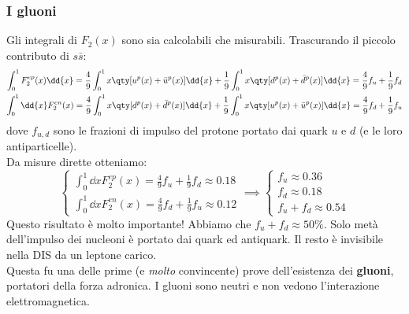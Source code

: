 \subsubsection{I gluoni}
Gli integrali di $F_2(x)$ sono sia calcolabili che misurabili. Trascurando il piccolo contributo di $s\bar s$:
\begin{gather*}
    \int_{0}^{1}F_2^{ep}(x)\dd{x}=\frac{4}{9}\int_{0}^{1}x\qty[u^p(x)+\bar u^p(x)]\dd{x}+\frac{1}{9}\int_{0}^{1}x\qty[d^p(x)+\bar d^p(x)]\dd{x}=\frac{4}{9}f_u+\frac{1}{9}f_d\\
    \int_{0}^{1}\dd{x}F_2^{en}(x)=\frac{4}{9}\int_{0}^{1}x\qty[d^p(x)+\bar d^p(x)]\dd{x}+\frac{1}{9}\int_{0}^{1}x\qty[u^p(x)+\bar u^p(x)]\dd{x}=\frac{4}{9}f_d+\frac{1}{9}f_u
\end{gather*}
dove $f_{u,d}$ sono le frazioni di impulso del protone portato dai quark $u$ e $d$ (e le loro antiparticelle).\\
Da misure dirette otteniamo:
\begin{equation*}
    \begin{cases}
        \int_{0}^{1}\dd{x}F_2^{ep}(x)=\frac{4}{9}f_u+\frac{1}{9}f_d\approx0.18\\
        \int_{0}^{1}\dd{x}F_2^{en}(x)=\frac{4}{9}f_d+\frac{1}{9}f_u\approx0.12
    \end{cases}\implies
    \begin{cases}
        f_u\approx0.36\\
        f_d\approx0.18\\
        f_u+f_d\approx0.54
    \end{cases}
\end{equation*}
Questo risultato è molto importante! Abbiamo che $f_u+f_d\approx50\%$. Solo metà dell'impulso dei nucleoni è portato dai quark ed antiquark. Il resto è invisibile nella DIS da un leptone carico.\\
Questa fu una delle prime (e \textit{molto} convincente) prove dell'esistenza dei \textbf{gluoni}, portatori della forza adronica. I gluoni sono neutri e non vedono l'interazione elettromagnetica.
